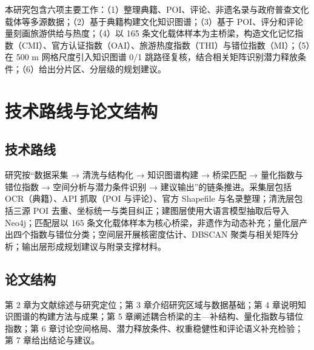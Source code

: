 本研究包含六项主要工作：（1）整理典籍、POI、评论、非遗名录与政府普查文化载体等多源数据；（2）基于典籍构建文化知识图谱；（3）基于 POI、评分和评论量刻画旅游供给与热度；（4）以 165 条文化载体样本为主桥梁，构造文化记忆指数（CMI）、官方认证指数（OAI）、旅游热度指数（THI）与错位指数（MI）；（5）在 500 m 网格尺度引入知识图谱 0/1 跳路径复核，结合相关矩阵识别潜力释放条件；（6）给出分片区、分层级的规划建议。

\section{技术路线与论文结构}\label{ux6280ux672fux8defux7ebfux4e0eux8bbaux6587ux7ed3ux6784}

\subsection{技术路线}\label{ux6280ux672fux8defux7ebf}

研究按``数据采集 → 清洗与结构化 → 知识图谱构建 → 桥梁匹配 → 量化指数与错位指数 → 空间分析与潜力条件识别 → 建议输出''的链条推进。采集层包括 OCR（典籍）、API 抓取（POI 与评论）、官方 Shapefile 与名录整理；清洗层包括三源 POI 去重、坐标统一与类目纠正；建图层使用大语言模型抽取后导入 Neo4j；匹配层以 165 条文化载体样本为核心桥梁，非遗作为动态补充；量化层产出四个指数与错位分类；空间层开展核密度估计、DBSCAN 聚类与相关矩阵分析；输出层形成规划建议与附录支撑材料。

\subsection{论文结构}\label{ux8bbaux6587ux7ed3ux6784}

第 2 章为文献综述与研究定位；第 3 章介绍研究区域与数据基础；第 4 章说明知识图谱的构建方法与成果；第 5 章阐述耦合桥梁的主---补结构、量化指数与错位指数；第 6 章讨论空间格局、潜力释放条件、权重稳健性和评论语义补充检验；第 7 章给出结论与建议。
